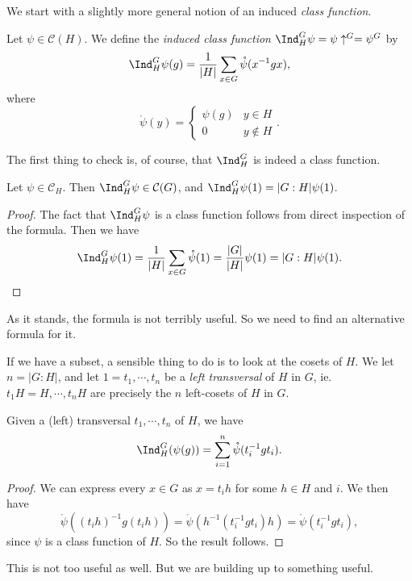 \documentclass[a4paper]{article}
\begin{document}
We start with a slightly more general notion of an induced \emph{class function}.
\begin{defi}
  Let $\psi \in \mathcal{C}(H)$. We define the \emph{induced class function} $\Ind^G_H \psi = \psi\uparrow^G = \psi^G$ by
  \[
    \Ind_H^G \psi(g) = \frac{1}{|H|} \sum_{x \in G} \mathring{\psi} (x^{-1}gx),
  \]
  where
  \[
    \mathring{\psi}(y) =
    \begin{cases}
      \psi(g) & y \in H\\
      0 & y \not\in H
    \end{cases}.
  \]
\end{defi}
The first thing to check is, of course, that $\Ind^G_H$ is indeed a class function.

\begin{lemma}
  Let $\psi \in \mathcal{C}_H$. Then $\Ind_H^G \psi \in \mathcal{C}(G)$, and $\Ind_H^G\psi(1) = |G:H| \psi(1)$.
\end{lemma}

\begin{proof}
  The fact that $\Ind_H^G\psi$ is a class function follows from direct inspection of the formula. Then we have
  \[
    \Ind_H^G \psi(1) = \frac{1}{|H|} \sum_{x \in G} \mathring{\psi}(1) = \frac{|G|}{|H|}\psi(1) = |G:H|\psi(1).
  \]
\end{proof}
As it stands, the formula is not terribly useful. So we need to find an alternative formula for it.

If we have a subset, a sensible thing to do is to look at the cosets of $H$. We let $n = |G:H|$, and let $1 = t_1, \cdots, t_n$ be a \emph{left transversal} of $H$ in $G$, ie. $t_1 H = H, \cdots, t_n H$ are precisely the $n$ left-cosets of $H$ in $G$.

\begin{lemma}
  Given a (left) transversal $t_1, \cdots, t_n$ of $H$, we have
  \[
    \Ind_H^G(\psi(g)) = \sum_{i = 1}^n \mathring{\psi}(t_i^{-1} g t_i).
  \]
\end{lemma}

\begin{proof}
  We can express every $x \in G$ as $x = t_i h$ for some $h \in H$ and $i$. We then have
  \[
    \mathring{\psi}((t_i h)^{-1} g(t_i h)) = \mathring{\psi}(h^{-1} (t_i^{-1} g t_i) h) = \mathring{\psi}(t_i^{-1} gt_i),
  \]
  since $\psi$ is a class function of $H$. So the result follows.
\end{proof}

This is not too useful as well. But we are building up to something useful.
\end{document}

